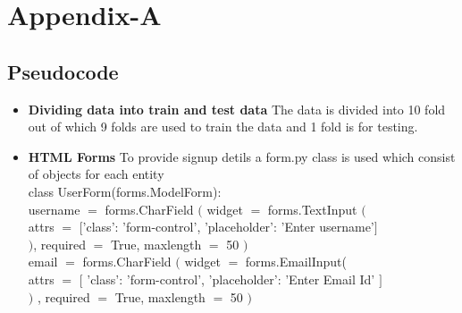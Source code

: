 \documentclass[oneside,12pt]{Classes/VTU}
\begin{document}
	\chapter*{Appendix-A}
	\section*{Pseudocode} 
	
	\begin{itemize}
		\item \textbf{Dividing data into train and test data} The data is divided into 10 fold out of which 9 folds are used to train the data and 1 fold is for testing.
		\item \textbf{HTML Forms} To provide signup detils a form.py class is used which consist of objects for each entity\\
		class UserForm(forms.ModelForm): \\
		username $=$ forms.CharField $($ widget $=$ forms.TextInput $($ \\
		attrs $=$ $[$'class': 'form-control', 'placeholder': 'Enter username'$]$ \\
		$)$, required $=$ True, maxlength $=$ 50 $)$ \\
		
		email $=$ forms.CharField $($ widget $=$ forms.EmailInput(  \\
		attrs $=$ $[$ 'class': 'form-control', 'placeholder': 'Enter Email Id' $]$  \\
		$)$ , required $=$ True, maxlength $=$ 50 $)$  \\
		

\end{itemize}
\end{document}
